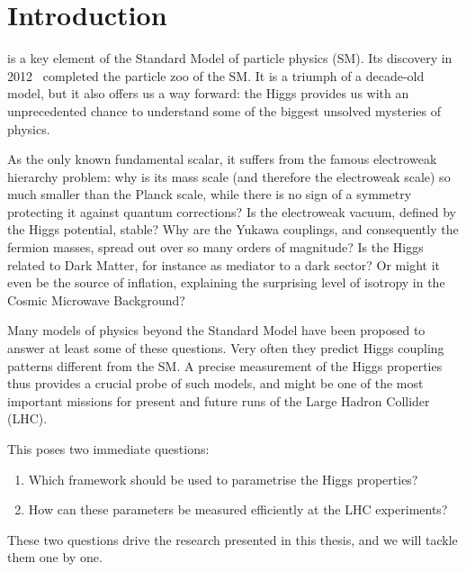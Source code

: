 

\chapter{Introduction}
\label{chapter:Introduction}

\cite{Higgs:1964ia, Higgs:1964pj, Englert:1964et} is a
key element of the Standard Model of particle physics (SM). Its
discovery in 2012~\cite{Aad:2012tfa, Chatrchyan:2012xdj} completed the
particle zoo of the SM. It is a triumph of a decade-old model, but it
also offers us a way forward: the Higgs provides us with an
unprecedented chance to understand some of the biggest unsolved
mysteries of physics.

As the only known fundamental scalar, it suffers from the famous
electroweak hierarchy problem: why is its mass scale (and therefore
the electroweak scale) so much smaller than the Planck scale, while
there is no sign of a symmetry protecting it against quantum
corrections? Is the electroweak vacuum, defined by the Higgs
potential, stable?  Why are the Yukawa couplings, and consequently the
fermion masses, spread out over so many orders of magnitude?  Is the
Higgs related to Dark Matter, for instance as mediator to a dark
sector? Or might it even be the source of inflation, explaining the
surprising level of isotropy in the Cosmic Microwave Background?

Many models of physics beyond the Standard Model have been proposed to
answer at least some of these questions. Very often they predict Higgs
coupling patterns different from the SM. A precise measurement of the
Higgs properties thus provides a crucial probe of such models, and
might be one of the most important missions for present and future
runs of the Large Hadron Collider (LHC).

This poses two immediate questions:
%
\begin{enumerate}
\item Which framework should be used to parametrise the Higgs
  properties?
\item How can these parameters be measured efficiently at the LHC
  experiments?
\end{enumerate}
%
These two questions drive the research presented in this thesis, and
we will tackle them one by one.

